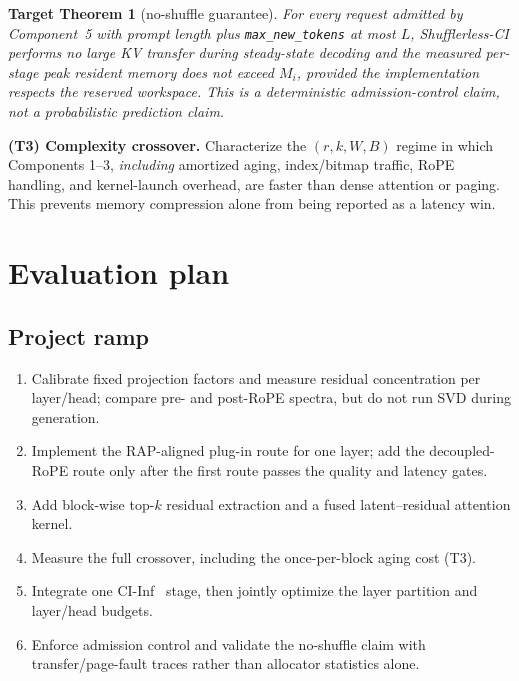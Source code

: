 \documentclass[11pt]{article}
\newtheorem{claim}{Target Theorem}
\begin{document}
\begin{claim}[no-shuffle guarantee]
For every request admitted by Component~5 with prompt length plus
\texttt{max\_new\_tokens} at most $L$, Shufflerless-CI performs no large KV transfer during
steady-state decoding and the measured per-stage peak resident memory does not exceed $M_i$,
provided the implementation respects the reserved workspace. This is a deterministic
admission-control claim, not a probabilistic prediction claim.
\end{claim}

\begin{theorybox}
\textbf{(T3) Complexity crossover.} Characterize the $(r,k,W,B)$ regime in which Components
1--3, \emph{including} amortized aging, index/bitmap traffic, RoPE handling, and kernel-launch
overhead, are faster than dense attention or paging. This prevents memory compression alone
from being reported as a latency win.
\end{theorybox}

\section{Evaluation plan}

\subsection{Project ramp}
\begin{enumerate}[leftmargin=1.6em,itemsep=1pt]
\item Calibrate fixed projection factors and measure residual concentration per layer/head;
compare pre- and post-RoPE spectra, but do not run SVD during generation.
\item Implement the RAP-aligned plug-in route for one layer; add the decoupled-RoPE route
only after the first route passes the quality and latency gates.
\item Add block-wise top-$k$ residual extraction and a fused latent--residual attention kernel.
\item Measure the full crossover, including the once-per-block aging cost (T3).
\item Integrate one CI-Inf~\cite{poster} stage, then jointly optimize the layer partition
and layer/head budgets.
\item Enforce admission control and validate the no-shuffle claim with transfer/page-fault
traces rather than allocator statistics alone.
\end{enumerate}
\end{document}
